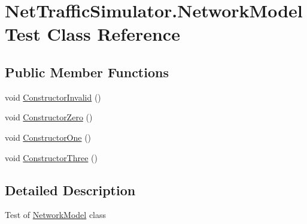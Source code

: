 \hypertarget{classNetTrafficSimulator_1_1NetworkModelTest}{\section{Net\-Traffic\-Simulator.\-Network\-Model\-Test Class Reference}
\label{classNetTrafficSimulator_1_1NetworkModelTest}
}
\subsection*{Public Member Functions}
\begin{DoxyCompactItemize}
\item 
void \hyperlink{classNetTrafficSimulator_1_1NetworkModelTest_afbd7470eb35b97512aa94a2f53163430}{Constructor\-Invalid} ()
\item 
void \hyperlink{classNetTrafficSimulator_1_1NetworkModelTest_a3634f2a5d0e008e7cd8b274615b173ee}{Constructor\-Zero} ()
\item 
void \hyperlink{classNetTrafficSimulator_1_1NetworkModelTest_a6a13d32fefa5e53b7f18e89b2fb8b436}{Constructor\-One} ()
\item 
void \hyperlink{classNetTrafficSimulator_1_1NetworkModelTest_a149aa9eab4b53fb17aa19be215e769b5}{Constructor\-Three} ()
\end{DoxyCompactItemize}


\subsection{Detailed Description}
Test of \hyperlink{classNetTrafficSimulator_1_1NetworkModel}{Network\-Model} class 

